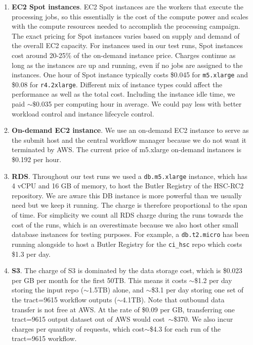\begin{enumerate}
\item \textbf{EC2 Spot instances}.
EC2 Spot instances are the workers that execute the processing jobs, so this essentially is the cost of the compute power and scales with the compute resources needed to accomplish the processing campaign.
The exact pricing for Spot instances varies based on supply and demand of the overall EC2 capacity.
For instances used in our test runs, Spot instances cost around 20-25\% of the on-demand instance price.
Charges continue as long as the instances are up and running, even if no jobs are assigned to the instances.
One hour of Spot instance typically costs \$0.045 for \texttt{m5.xlarge} and \$0.08 for \texttt{r4.2xlarge}.
Different mix of instance types could affect the performance as well as the total cost.
Including the instance idle time, we paid $\sim\$$0.035 per computing hour in average.
We could pay less with better workload control and instance lifecycle control.

\item \textbf{On-demand EC2 instance}.
We use an on-demand EC2 instance to serve as the submit host and the central workflow manager because we do not want it terminated by AWS.
The current price of m5.xlarge on-demand instances is \$0.192 per hour.

\item \textbf{RDS}.
Throughout our test runs we used a \texttt{db.m5.xlarge} instance, which has 4 vCPU and 16 GB of memory, to host the Butler Registry of the HSC-RC2 repository.
We are aware this DB instance is more powerful than we usually need but we keep it running.
The charge is therefore proportional to the span of time.
For simplicity we count all RDS charge during the runs towards the cost of the runs, which is an overestimate because we also host other small database instances for testing purposes.
For example, a \texttt{db.t2.micro} has been running alongside to host a Butler Registry for the \texttt{ci\_hsc} repo which costs \$1.3 per day.

\item \textbf{S3}.
The charge of S3 is dominated by the data storage cost, which is \$0.023 per GB per month for the first 50TB.
This means it costs $\sim$\$1.2 per day storing the input repo ($\sim$1.5TB) alone, and $\sim$\$3.1 per day storing one set of the tract=9615 workflow outputs ($\sim$4.1TB).
Note that outbound data transfer is not free at AWS.
At the rate of \$0.09 per GB, transferring one tract=9615 output dataset out of AWS would cost~$\sim$\$370.
We also incur charges per quantity of requests, which cost$\sim$\$4.3 for each run of the tract=9615 workflow.


\end{enumerate}
